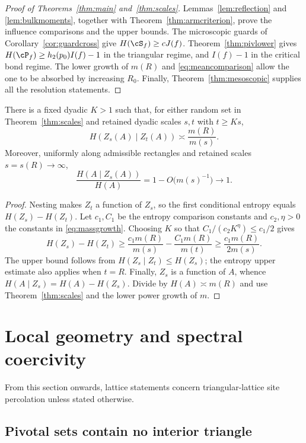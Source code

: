 \begin{proof}[Proof of Theorems~\ref{thm:main} and~\ref{thm:scales}]
Lemmas~\ref{lem:reflection} and \ref{lem:bulkmoments}, together with Theorem~\ref{thm:armcriterion}, prove the influence comparisons and the upper bounds. The microscopic guards of Corollary~\ref{cor:guardcross} give $H(\cS_f)\ge cJ(f)$. Theorem~\ref{thm:pivlower} gives $H(\cP_f)\ge h_2(p_0)I(f)-1$ in the triangular regime, and $I(f)-1$ in the critical bond regime. The lower growth of $m(R)$ and \eqref{eq:meancomparison} allow the one to be absorbed by increasing $R_0$. Finally, Theorem~\ref{thm:mesoscopic} supplies all the resolution statements.
\end{proof}

\begin{corollary}\label{cor:resolution_information}
There is a fixed dyadic $K>1$ such that, for either random set in Theorem~\ref{thm:scales} and retained dyadic scales $s,t$ with $t\ge Ks$,
\[
 H(Z_s(A)\mid Z_t(A))\asymp\frac{m(R)}{m(s)}.
\]
Moreover, uniformly along admissible rectangles and retained scales $s=s(R)\to\infty$,
\[
 \frac{H(A\mid Z_s(A))}{H(A)}=1-O\bigl(m(s)^{-1}\bigr)\longrightarrow1.
\]
\end{corollary}
\begin{proof}
Nesting makes $Z_t$ a function of $Z_s$, so the first conditional entropy equals $H(Z_s)-H(Z_t)$. Let $c_1,C_1$ be the entropy comparison constants and $c_2,\eta>0$ the constants in \eqref{eq:massgrowth}. Choosing $K$ so that $C_1/(c_2K^\eta)\le c_1/2$ gives
\[
 H(Z_s)-H(Z_t)\ge\frac{c_1m(R)}{m(s)}-\frac{C_1m(R)}{m(t)}\ge\frac{c_1m(R)}{2m(s)}.
\]
The upper bound follows from $H(Z_s\mid Z_t)\le H(Z_s)$; the entropy upper estimate also applies when $t=R$. Finally, $Z_s$ is a function of $A$, whence $H(A\mid Z_s)=H(A)-H(Z_s)$. Divide by $H(A)\asymp m(R)$ and use Theorem~\ref{thm:scales} and the lower power growth of $m$.
\end{proof}

\section{Local geometry and spectral coercivity}\label{sec:localgeometry}

From this section onwards, lattice statements concern triangular-lattice site percolation unless stated otherwise.

\subsection{Pivotal sets contain no interior triangle}\label{sec:pivotal}

